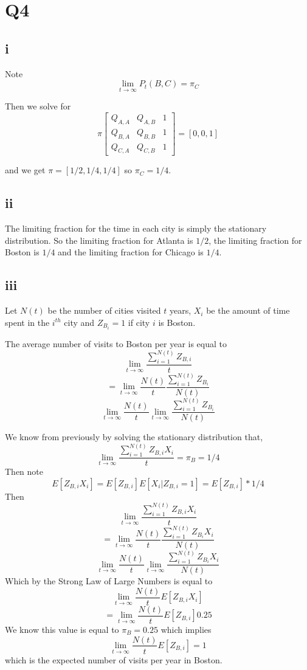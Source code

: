 \documentclass{article}
\begin{document}
\section*{Q4}
\subsection*{i}
Note
$$
\lim_{t \to \infty} P_t(B,C) = \pi_C
$$

Then we solve for
$$
\pi \begin{bmatrix}
Q_{A,A} & Q_{A,B} & 1 \\
Q_{B,A} & Q_{B,B} & 1 \\
Q_{C,A} & Q_{C,B} & 1
\end{bmatrix}
= [0, 0, 1]
$$


and we get $\pi = [ 1/2,1/4, 1/4]$
so $\pi_C = 1/4$.

\subsection*{ii}
The limiting fraction for the time in each city is simply the stationary distribution.
So
the limiting fraction for Atlanta is $1/2$, the limiting fraction for Boston is $1/4$ and the limiting fraction for Chicago is $1/4$.

\subsection*{iii}
Let $N(t)$ be the number of cities visited $t$ years, $X_{i}$ be the amount of time spent in the $i^{th}$ city and $Z_{B_i} = 1$ if city $i$ is Boston.

The average number of visits to Boston per year is equal to 
$$
\lim_{t \to \infty} 
 \frac{\sum_{i = 1}^{N(t)} Z_{B,i}}{t}  
$$
$$ 
 = \lim_{t \to \infty} \frac{N(t)}{t} \frac{\sum_{i=1}^{N(t)} Z_{B_i}}{N(t)}
$$
$$
 \lim_{t \to \infty} \frac{N(t)}{t} \lim_{t \to \infty} \frac{\sum_{i=1}^{N(t)} Z_{B_i}}{N(t)}
$$

We know from previously by solving the stationary distribution that,
$$
\lim_{t \to \infty} \frac{\sum_{i = 1}^{N(t)} Z_{B,i}X_i}{t} = \pi_B = 1/4
$$
Then note
$$
E[Z_{B,i}X_i] = E[Z_{B,i}]E[X_i | Z_{B,i} = 1] = E[Z_{B,i}]*1/4
$$
Then
$$
\lim_{t \to \infty} 
 \frac{\sum_{i = 1}^{N(t)} Z_{B,i}X_i}{t}  
$$
$$ 
 = \lim_{t \to \infty} \frac{N(t)}{t} \frac{\sum_{i=1}^{N(t)} Z_{B_i}X_i}{N(t)}
$$
$$
 \lim_{t \to \infty} \frac{N(t)}{t} \lim_{t \to \infty} \frac{\sum_{i=1}^{N(t)} Z_{B_i}X_i}{N(t)}
$$
Which by the Strong Law of Large Numbers is equal to 
$$
\lim_{t \to \infty} \frac{N(t)}{t} E[Z_{B,i} X_i]
$$
$$
= \lim_{t \to \infty} \frac{N(t)}{t} E[Z_{B,i}] 0.25
$$
We know this value is equal to $\pi_B = 0.25$ which implies
$$
\lim_{t \to \infty} \frac{N(t)}{t} E[Z_{B,i}] = 1
$$
which is the expected number of visits per year in Boston.
\end{document}

